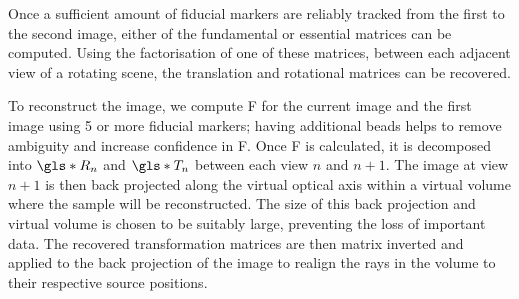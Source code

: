 \documentclass{osa-article}
\begin{document}

Once a sufficient amount of fiducial markers are reliably tracked from the first to the second image, either of the fundamental or essential matrices can be computed. Using the factorisation of one of these matrices, between each adjacent view of a rotating scene, the translation and rotational matrices can be recovered.

To reconstruct the image, we compute \gls*{F} for the current image and the first image using 5 or more fiducial markers; having additional beads helps to remove ambiguity and increase confidence in \gls*{F}.
Once \gls*{F} is calculated, it is decomposed into \(\gls*{R}_n\) and \(\gls*{T}_n\) between each view \(n\) and \(n+1\).
The image at view \(n+1\) is then back projected along the virtual optical axis within a virtual volume where the sample will be reconstructed.
The size of this back projection and virtual volume is chosen to be suitably large, preventing the loss of important data.
The recovered transformation matrices are then matrix inverted and applied to the back projection of the image to realign the rays in the volume to their respective source positions. %
\end{document}
